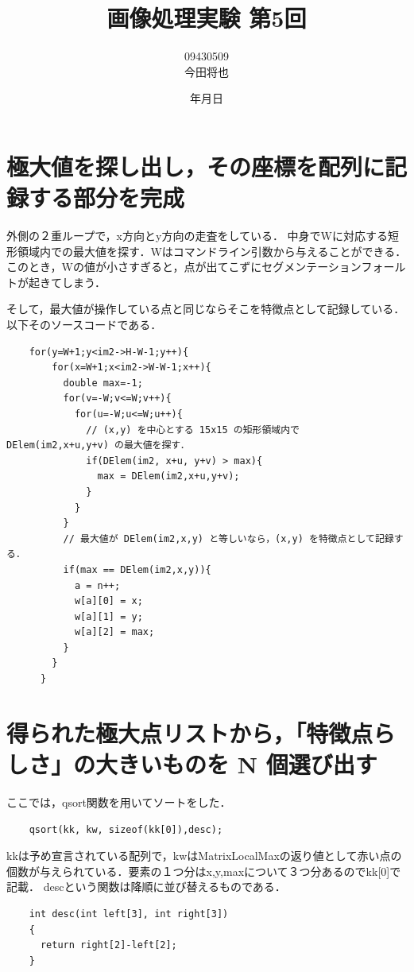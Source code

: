 \documentclass[11pt]{jarticle}
\begin{document}
\title{画像処理実験 第5回}
\author{09430509\\今田将也}
\date{\number\year 年\number\month 月\number\day 日}
\maketitle

\section{極大値を探し出し，その座標を配列に記録する部分を完成}

外側の２重ループで，x方向とy方向の走査をしている．
中身でWに対応する短形領域内での最大値を探す．Wはコマンドライン引数から与えることができる．
このとき，Wの値が小さすぎると，点が出てこずにセグメンテーションフォールトが起きてしまう．

そして，最大値が操作している点と同じならそこを特徴点として記録している．以下そのソースコードである．

\begin{verbatim}
    for(y=W+1;y<im2->H-W-1;y++){
        for(x=W+1;x<im2->W-W-1;x++){
          double max=-1;
          for(v=-W;v<=W;v++){
            for(u=-W;u<=W;u++){
              // (x,y) を中心とする 15x15 の矩形領域内で DElem(im2,x+u,y+v) の最大値を探す．
              if(DElem(im2, x+u, y+v) > max){
                max = DElem(im2,x+u,y+v);
              } 
            }
          }
          // 最大値が DElem(im2,x,y) と等しいなら，(x,y) を特徴点として記録する． 
          if(max == DElem(im2,x,y)){
            a = n++; 
            w[a][0] = x;
            w[a][1] = y;
            w[a][2] = max;
          }
        }
      }
\end{verbatim}

\section{得られた極大点リストから，「特徴点らしさ」の大きいものを N 個選び出す}

ここでは，qsort関数を用いてソートをした．

\begin{verbatim}
    qsort(kk, kw, sizeof(kk[0]),desc);
\end{verbatim}

kkは予め宣言されている配列で，kwはMatrixLocalMaxの返り値として赤い点の個数が与えられている．要素の１つ分はx,y,maxについて３つ分あるのでkk[0]で記載．
descという関数は降順に並び替えるものである．
\begin{verbatim}
    int desc(int left[3], int right[3])
    {
      return right[2]-left[2];
    }
\end{verbatim}
\end{document}
